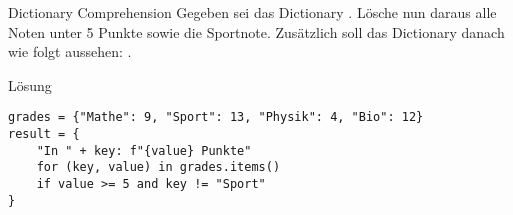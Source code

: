 \begin{fragile}[Übung]

\begin{block}{Dictionary Comprehension}
\vspace{2pt}
Gegeben sei das Dictionary 
. 
Lösche nun daraus alle Noten unter 5 Punkte sowie die Sportnote. Zusätzlich soll das Dictionary danach wie folgt aussehen: 
. 

\end{block}


\vspace{12pt}

\begin{solutionblock}{Lösung}
\begin{verbatim}
grades = {"Mathe": 9, "Sport": 13, "Physik": 4, "Bio": 12}
result = {
    "In " + key: f"{value} Punkte"
    for (key, value) in grades.items()
    if value >= 5 and key != "Sport"
}
\end{verbatim}
\end{solutionblock}

\end{fragile}










